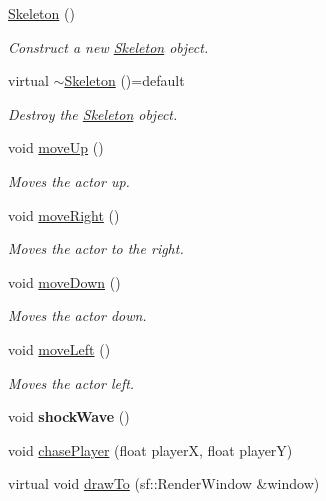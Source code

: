 \begin{DoxyCompactItemize}
\item 
\mbox{\hyperlink{classSkeleton_af01a02f1ce9ae4c801cd6e66ccf7407f}{Skeleton}} ()
\begin{DoxyCompactList}\small\item\em Construct a new \mbox{\hyperlink{classSkeleton}{Skeleton}} object. \end{DoxyCompactList}\item 
virtual \mbox{\hyperlink{classSkeleton_ae6a32fa46fd502bc2f6c2cfafff24003}{$\sim$\+Skeleton}} ()=default
\begin{DoxyCompactList}\small\item\em Destroy the \mbox{\hyperlink{classSkeleton}{Skeleton}} object. \end{DoxyCompactList}\item 
void \mbox{\hyperlink{classSkeleton_a0ddbea7574ada0b5cef0cadbd4a0dd9f}{move\+Up}} ()
\begin{DoxyCompactList}\small\item\em Moves the actor up. \end{DoxyCompactList}\item 
void \mbox{\hyperlink{classSkeleton_a3d8ce7b8a1d10e4a33a27f0eee54042e}{move\+Right}} ()
\begin{DoxyCompactList}\small\item\em Moves the actor to the right. \end{DoxyCompactList}\item 
void \mbox{\hyperlink{classSkeleton_aee2055fa3d1db80392b365aa40c878bf}{move\+Down}} ()
\begin{DoxyCompactList}\small\item\em Moves the actor down. \end{DoxyCompactList}\item 
void \mbox{\hyperlink{classSkeleton_ab03c65cdabc94f280443691653112d3a}{move\+Left}} ()
\begin{DoxyCompactList}\small\item\em Moves the actor left. \end{DoxyCompactList}\item 
\mbox{\label{classSkeleton_a6113054cad95c0eefbe3c64c58027f86}} 
void {\bfseries shock\+Wave} ()
\item 
void \mbox{\hyperlink{classSkeleton_aefa4683beb507bafaa2b20eaba4f478d}{chase\+Player}} (float playerX, float playerY)
\item 
virtual void \mbox{\hyperlink{classSkeleton_aa39ac09590a5274536dc2fc125cc62e6}{draw\+To}} (sf\+::\+Render\+Window \&window)
\end{DoxyCompactItemize}
